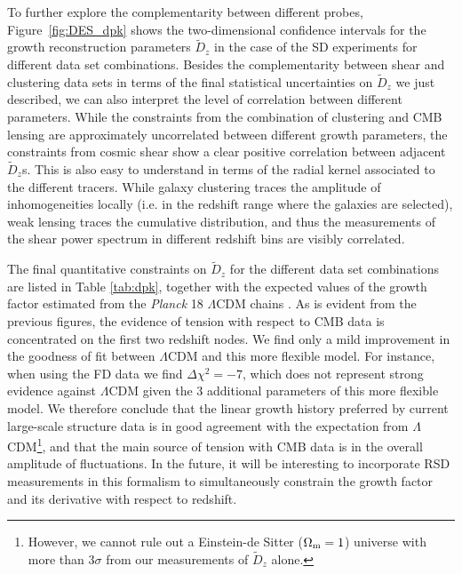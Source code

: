 \documentclass[a4paper,11pt]{article}
\newcommand{\Om}{\Omega_{\rm m}}
\newcommand{\lcdm}{$\Lambda$CDM\xspace}
\newcommand{\planck}{{\sl Planck}\xspace}
\newcommand{\southd}{SD\xspace}
\newcommand{\alld}{FD\xspace}
\begin{document}
      To further explore the complementarity between different probes, Figure~\ref{fig:DES_dpk} shows the two-dimensional confidence intervals for the growth reconstruction parameters $\tilde{D}_z$ in the case of the \southd experiments for different data set combinations. Besides the complementarity between shear and clustering data sets in terms of the final statistical uncertainties on $\tilde{D}_z$ we just described, we can also interpret the level of correlation between different parameters. While the constraints from the combination of clustering and CMB lensing are approximately uncorrelated between different growth parameters, the constraints from cosmic shear show a clear positive correlation between adjacent $\tilde{D}_z$s. This is also easy to understand in terms of the radial kernel associated to the different tracers. While galaxy clustering traces the amplitude of inhomogeneities locally (i.e. in the redshift range where the galaxies are selected), weak lensing traces the cumulative distribution, and thus the measurements of the shear power spectrum in different redshift bins are visibly correlated.
      
      The final quantitative constraints on $\tilde{D}_z$ for the different data set combinations are listed in Table \ref{tab:dpk}, together with the expected values of the growth factor estimated from the \planck 18 \lcdm  chains \cite{1807.06209}. As is evident from the previous figures, the evidence of tension with respect to CMB data is concentrated on the first two redshift nodes. We find only a mild improvement in the goodness of fit between \lcdm and this more flexible model. For instance, when using the \alld data we find $\Delta\chi^2=-7$, which does not represent strong evidence against \lcdm given the 3 additional parameters of this more flexible model. We therefore conclude that the linear growth history preferred by current large-scale structure data is in good agreement with the expectation from \lcdm \footnote{However, we cannot rule out a Einstein-de Sitter ($\Om=1$) universe with more than $3\sigma$ from our measurements of $\tilde{D}_{z}$ alone.}, and that the main source of tension with CMB data is in the overall amplitude of fluctuations. In the future, it will be interesting to incorporate RSD measurements in this formalism to simultaneously constrain the growth factor and its derivative with respect to redshift.

\end{document}
